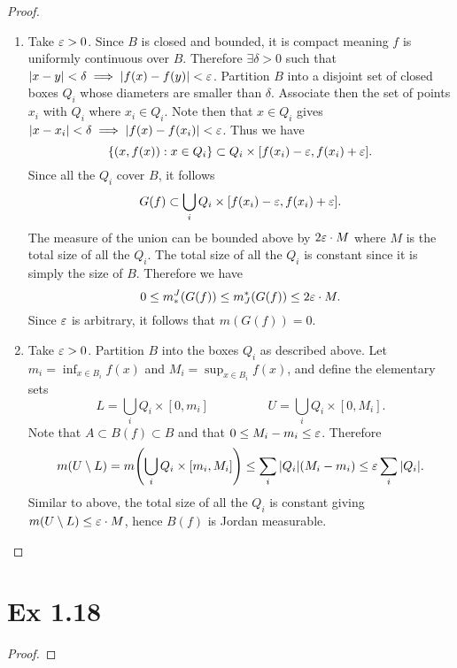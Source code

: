 \documentclass[hw_all.tex]{subfiles}
\begin{document}
\begin{proof}
    \begin{enumerate}[label=\roman*)]
        \item 
            Take $\varepsilon > 0$. Since $B$ is closed and bounded, it is compact meaning $f$ is uniformly continuous over $B$. Therefore $\exists \delta > 0$ such that $|x-y| < \delta \implies |f(x) - f(y)| < \varepsilon$. Partition $B$ into a disjoint set of closed boxes $Q_i$ whose diameters are smaller than $\delta$. Associate then the set of points $x_i$ with $Q_i$ where $x_i \in Q_i$. Note then that $x \in Q_i$ gives $|x - x_i| < \delta \implies |f(x) - f(x_i)| < \varepsilon$. Thus we have
            \[
                \qty{(x,f(x)) : x \in Q_i} \subset Q_i \times [f(x_i) - \varepsilon, f(x_i) + \varepsilon]
            .\]
            Since all the $Q_i$ cover $B$, it follows
            \[
                G(f) \subset \bigcup_i Q_i \times [f(x_i) - \varepsilon, f(x_i) + \varepsilon]
            .\]
            The measure of the union can be bounded above by $2 \varepsilon \cdot M$ where $M$ is the total size of all the $Q_i$. The total size of all the $Q_i$ is constant since it is simply the size of $B$. Therefore we have
            \[
                0 \leq m_*^J(G(f)) \leq m^*_J(G(f)) \leq 2 \varepsilon \cdot M
            .\]
            Since $\varepsilon$ is arbitrary, it follows that $m(G(f)) = 0$.

        \item 
            Take $\varepsilon > 0$. Partition $B$ into the boxes $Q_i$ as described above. Let $m_i = \inf_{x \in B_i} f(x)$ and $M_i = \sup_{x \in B_i} f(x)$, and define the elementary sets
            \[
                L = \bigcup_{i} Q_i \times [0, m_i] \hspace{2cm} U = \bigcup_{i} Q_i \times [0, M_i].
            \]
            Note that $A \subset B(f) \subset B$ and that $0 \leq M_i - m_i \leq \varepsilon$. Therefore
            \[
                m(U \setminus L) = m\qty(\bigcup_i Q_i \times [m_i, M_i]) \leq \sum_i |Q_i| (M_i - m_i) \leq \varepsilon \sum_i |Q_i|
            .\]
            Similar to above, the total size of all the $Q_i$ is constant giving $m(U \setminus L) \leq \varepsilon \cdot M$, hence $B(f)$ is Jordan measurable.
    \end{enumerate}
\end{proof}

\section*{Ex 1.18}

\begin{proof}
    
\end{proof}
\end{document}
